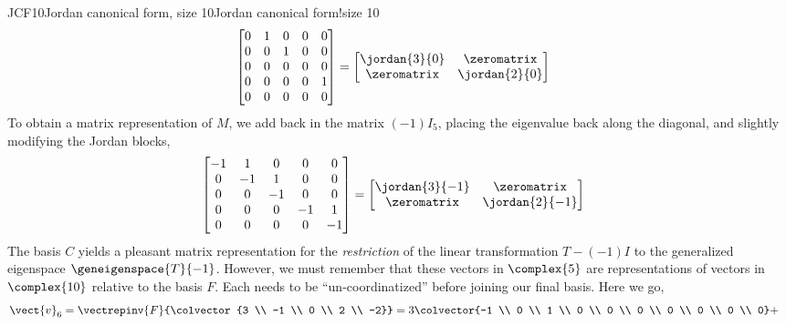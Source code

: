 \begin{example}{JCF10}{Jordan canonical form, size 10}{Jordan canonical form!size 10}
%
\begin{align*}
\begin{bmatrix}
0 & 1 & 0 & 0 & 0 \\
0 & 0 & 1 & 0 & 0 \\
0 & 0 & 0 & 0 & 0 \\
0 & 0 & 0 & 0 & 1 \\
0 & 0 & 0 & 0 & 0
\end{bmatrix}
&=
\begin{bmatrix}
\jordan{3}{0} & \zeromatrix \\
\zeromatrix & \jordan{2}{0} \\
\end{bmatrix}
%
\end{align*}
%
To obtain a matrix representation of $M$, we add back in the matrix $(-1)I_5$, placing the eigenvalue back along the diagonal, and slightly modifying the Jordan blocks,
%
\begin{align*}
\begin{bmatrix}
-1 & 1 & 0 & 0 & 0 \\
0 & -1 & 1 & 0 & 0 \\
0 & 0 & -1 & 0 & 0 \\
0 & 0 & 0 & -1 & 1 \\
0 & 0 & 0 & 0 & -1
\end{bmatrix}
&=
\begin{bmatrix}
\jordan{3}{-1} & \zeromatrix \\
\zeromatrix & \jordan{2}{-1} \\
\end{bmatrix}
%
\end{align*}
%
The basis $C$ yields a pleasant matrix representation for the {\em restriction} of the linear transformation $T-(-1)I$ to the generalized eigenspace $\geneigenspace{T}{-1}$.  However, we must remember that these vectors in $\complex{5}$ are representations of vectors in $\complex{10}$ relative to the basis $F$.  Each needs to be ``un-coordinatized'' before joining our final basis.  Here we go,
%
\begin{align*}
\vect{v}_6&=\vectrepinv{F}{\colvector{3 \\ -1 \\ 0 \\ 2 \\ -2}}=
3\colvector{-1 \\ 0 \\ 1 \\ 0 \\ 0 \\ 0 \\ 0 \\ 0 \\ 0 \\ 0}+

\end{align*}
\end{example}
